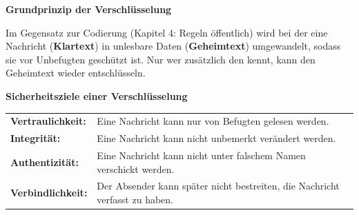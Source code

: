 \documentclass[11pt,a4paper]{article}
\newcommand{\schluessel}[1][black]{\tikz[baseline=-0.6ex,#1,line width=0.9pt]{\draw (0,0) circle (0.11); \draw (0.11,0) -- (0.5,0); \draw (0.38,0) -- (0.38,-0.1) (0.46,0) -- (0.46,-0.1);}}
\begin{document}
\newpage
\textbf{Grundprinzip der Verschlüsselung}\par\vspace{1mm}
\begin{minipage}[c]{0.5\linewidth}
\centering
{}
\end{minipage}\hfill
\begin{minipage}[c]{0.47\linewidth}
{\lueckentext Im Gegensatz zur Codierung (Kapitel 4: Regeln öffentlich) wird bei der  eine Nachricht (\textbf{Klartext}) in unlesbare Daten (\textbf{Geheimtext}) umgewandelt, sodass sie vor Unbefugten geschützt ist. Nur wer zusätzlich den  kennt, kann den Geheimtext wieder entschlüsseln.\par}
\end{minipage}

\medskip
\textbf{Sicherheitsziele einer Verschlüsselung}\par
\begin{tabularx}{\linewidth}{@{}l X@{}}
\textbf{Vertraulichkeit:} & Eine Nachricht kann nur von Befugten gelesen werden.\\
\textbf{Integrität:} & Eine Nachricht kann nicht unbemerkt verändert werden.\\
\textbf{Authentizität:} & Eine Nachricht kann nicht unter falschem Namen verschickt werden.\\
\textbf{Verbindlichkeit:} & Der Absender kann später nicht bestreiten, die Nachricht verfasst zu haben.\\
\end{tabularx}
\end{document}
